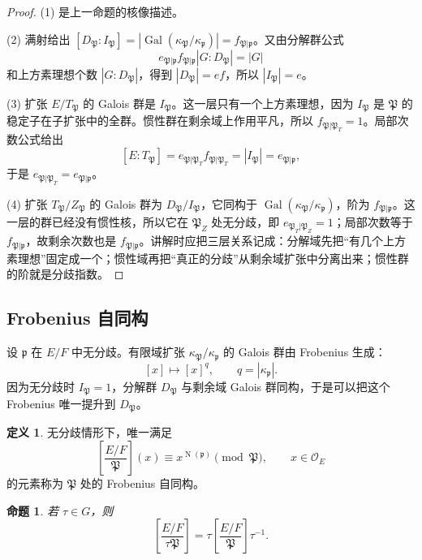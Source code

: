 \documentclass[11pt,a4paper,openany]{ctexbook}
\numberwithin{equation}{chapter}
\newcommand{\Gal}{\operatorname{Gal}}
\newcommand{\Nm}{\operatorname{N}}
\theoremstyle{plain}
\newtheorem{proposition}[theorem]{命题}
\theoremstyle{definition}
\newtheorem{definition}[theorem]{定义}
\theoremstyle{remark}
\begin{document}
\begin{proof}
(1) 是上一命题的核像描述。

(2) 满射给出 $[D_{\mathfrak P}:I_{\mathfrak P}]
=|\Gal(\kappa_{\mathfrak P}/\kappa_{\mathfrak p})|=f_{\mathfrak P|\mathfrak p}$。又由分解群公式
\[
e_{\mathfrak P|\mathfrak p}f_{\mathfrak P|\mathfrak p}
|G:D_{\mathfrak P}|=|G|
\]
和上方素理想个数 $|G:D_{\mathfrak P}|$，得到 $|D_{\mathfrak P}|=ef$，所以 $|I_{\mathfrak P}|=e$。

(3) 扩张 $E/T_{\mathfrak P}$ 的 Galois 群是 $I_{\mathfrak P}$。这一层只有一个上方素理想，因为
$I_{\mathfrak P}$ 是 $\mathfrak P$ 的稳定子在子扩张中的全群。惯性群在剩余域上作用平凡，所以
$f_{\mathfrak P|\mathfrak P_T}=1$。局部次数公式给出
\[
[E:T_{\mathfrak P}]=e_{\mathfrak P|\mathfrak P_T}f_{\mathfrak P|\mathfrak P_T}
=|I_{\mathfrak P}|=e_{\mathfrak P|\mathfrak p},
\]
于是 $e_{\mathfrak P|\mathfrak P_T}=e_{\mathfrak P|\mathfrak p}$。

(4) 扩张 $T_{\mathfrak P}/Z_{\mathfrak P}$ 的 Galois 群为
$D_{\mathfrak P}/I_{\mathfrak P}$，它同构于
$\Gal(\kappa_{\mathfrak P}/\kappa_{\mathfrak p})$，阶为
$f_{\mathfrak P|\mathfrak p}$。这一层的群已经没有惯性核，所以它在
$\mathfrak P_Z$ 处无分歧，即 $e_{\mathfrak P_T|\mathfrak P_Z}=1$；局部次数等于
$f_{\mathfrak P|\mathfrak p}$，故剩余次数也是 $f_{\mathfrak P|\mathfrak p}$。讲解时应把三层关系记成：分解域先把“有几个上方素理想”固定成一个；惯性域再把“真正的分歧”从剩余域扩张中分离出来；惯性群的阶就是分歧指数。
\end{proof}

\subsection{Frobenius 自同构}

设 $\mathfrak p$ 在 $E/F$ 中无分歧。有限域扩张 $\kappa_{\mathfrak P}/\kappa_{\mathfrak p}$ 的 Galois 群由 Frobenius 生成：
\[
[x]\longmapsto [x]^q,\qquad q=|\kappa_{\mathfrak p}|.
\]
因为无分歧时 $I_{\mathfrak P}=1$，分解群 $D_{\mathfrak P}$ 与剩余域 Galois 群同构，于是可以把这个 Frobenius 唯一提升到 $D_{\mathfrak P}$。

\begin{definition}
无分歧情形下，唯一满足
\[
\left[\frac{E/F}{\mathfrak P}\right](x)\equiv x^{\Nm(\mathfrak p)}
\pmod{\mathfrak P},
\qquad x\in\mathcal O_E
\]
的元素称为 $\mathfrak P$ 处的 Frobenius 自同构。
\end{definition}

\begin{proposition}
若 $\tau\in G$，则
\[
\left[\frac{E/F}{\tau\mathfrak P}\right]
=\tau\left[\frac{E/F}{\mathfrak P}\right]\tau^{-1}.
\]
\end{proposition}
\end{document}
